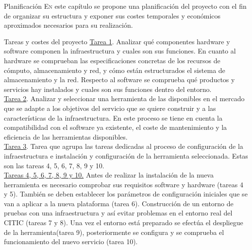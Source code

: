 \begin{chapter}{Planificación}
\label{chap:planificacionProyecto}
\lettrine{E}{n} este capítulo se propone una planificación del proyecto con el fin de organizar su estructura y exponer sus costes temporales y económicos aproximados necesarios para su realización.
\begin{section}{Tareas y costes del proyecto}
\underline{Tarea 1}. Analizar qué componentes hardware y software componen la infraestructura y cuales son sus funciones. En cuanto al hardware se comprueban las especificaciones concretas de los recursos de cómputo, almacenamiento y red, y cómo están estructurados el sistema de almacenamiento y la red. Respecto al software se comprueba qué productos y servicios hay instalados y cuales son sus funciones dentro del entorno.\\
\underline{Tarea 2}. Analizar y seleccionar una herramienta de las disponibles en el mercado que se adapte a los objetivos del servicio que se quiere construir y a las características de la infraestructura. En este proceso se tiene en cuenta la compatibilidad con el software ya existente, el coste de mantenimiento y la eficiencia de las herramientas disponibles.\\
\underline{Tarea 3}. Tarea que agrupa las tareas dedicadas al proceso de configuración de la infraestructura e instalación y configuración de la herramienta seleccionada. Estas son las tareas 4, 5, 6, 7, 8, 9 y 10.\\
\underline{Tareas 4, 5, 6, 7, 8, 9 y 10.} Antes de realizar la instalación de la nueva herramienta es necesario comprobar sus requisitos software y hardware (tareas 4 y 5). También se deben establecer los parámetros de configuración iniciales que se van a aplicar a la nueva plataforma (tarea 6). Construcción de un entorno de pruebas con una infraestructura y así evitar problemas en el entorno real del CITIC (tareas 7 y 8). Una vez el entorno está preparado se efectúa el despliegue de la herramienta(tarea 9), posteriormente se configura y se comprueba el funcionamiento del nuevo servicio (tarea 10).\\

\end{section}
\end{chapter}
